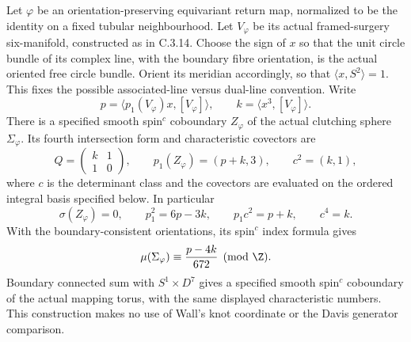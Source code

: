 \begin{proposition}
Let $\varphi$ be an orientation-preserving equivariant return map,
normalized to be the identity on a fixed tubular neighbourhood.
Let $V_\varphi$ be its actual framed-surgery six-manifold, constructed
as in C.3.14. Choose the sign of $x$ so that the unit circle
bundle of its complex line, with the boundary fibre orientation,
is the actual oriented free circle bundle. Orient its meridian
accordingly, so that $\langle x,S^2\rangle=1$. This fixes the
possible associated-line versus dual-line convention. Write
\[
 p=\langle p_1(V_\varphi)x,[V_\varphi]\rangle,
 \qquad k=\langle x^3,[V_\varphi]\rangle.
\]
There is a specified smooth spin$^c$ coboundary $Z_\varphi$ of
the actual clutching sphere $\Sigma_\varphi$. Its fourth
intersection form and characteristic covectors are
\[
 Q=\begin{pmatrix}k&1\\1&0\end{pmatrix},\qquad
 p_1(Z_\varphi)=(p+k,3),\qquad c^2=(k,1),
\]
where $c$ is the determinant class and the covectors are evaluated
on the ordered integral basis specified below. In particular
\[
 \sigma(Z_\varphi)=0,\qquad
 p_1^2=6p-3k,\qquad p_1c^2=p+k,\qquad c^4=k.
\]
With the boundary-consistent orientations, its spin$^c$ index
formula gives
\[
 \mu(\Sigma_\varphi)\equiv\frac{p-4k}{672}\pmod\Z.
\]
Boundary connected sum with $S^1\times D^7$ gives a specified
smooth spin$^c$ coboundary of the actual mapping torus, with the
same displayed characteristic numbers. This construction makes
no use of Wall's knot coordinate or the Davis generator comparison.
\end{proposition}
